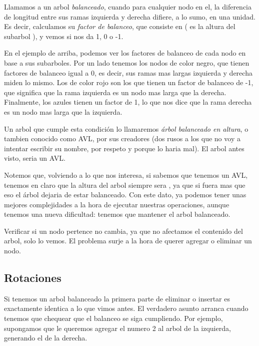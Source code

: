 \documentclass{article}
\begin{document}

Llamamos a un arbol \textit{balanceado}, cuando para cualquier nodo en el, la diferencia de longitud entre sus ramas izquierda y derecha difiere, a lo sumo, en una unidad. Es decir, calculamos su \textit{factor de balanceo}, que consiste en  ( es la altura del subarbol ), y vemos si nos da 1, 0 o -1.

En el ejemplo de arriba, podemos ver los factores de balanceo de cada nodo en base a sus subarboles. Por un lado tenemos los nodos de color negro, que tienen factores de balanceo igual a 0, es decir, sus ramas mas largas izquierda y derecha miden lo mismo. Los de color rojo son los que tienen un factor de balanceo de -1, que significa que la rama izquierda es un nodo mas larga que la derecha. Finalmente, los azules tienen un factor de 1, lo que nos dice que la rama derecha es un nodo mas larga que la izquierda.

Un arbol que cumple esta condición lo llamaremos \textit{árbol balanceado en altura}, o tambien conocido como AVL, por sus creadores (dos rusos a los que no voy a intentar escribir su nombre, por respeto y porque lo haria mal). El arbol antes visto, seria un AVL.

Notemos que, volviendo a lo que nos interesa, si sabemos que tenemos un AVL, tenemos en claro que la altura del arbol siempre sera , ya que si fuera mas que eso el árbol dejaria de estar balanceado. Con este dato, ya podemos tener unas mejores complejidades a la hora de ejecutar nuestras operaciones, aunque tenemos una nueva dificultad: tenemos que mantener el arbol balanceado.

Verificar si un nodo pertence no cambia, ya que no afectamos el contenido del arbol, solo lo vemos. El problema surje a la hora de querer agregar o eliminar un nodo.

\subsection{Rotaciones}

Si tenemos un arbol balanceado la primera parte de eliminar o insertar es exactamente identica a lo que vimos antes. El verdadero asunto arranca cuando tenemos que chequear que el balanceo se siga cumpliendo. Por ejemplo, supongamos que le queremos agregar el numero 2 al arbol de la izquierda, generando el de la derecha.
\end{document}
